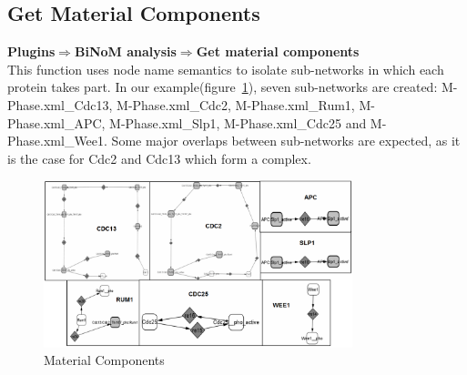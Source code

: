 \subsection{Get Material Components}
\textbf{Plugins$\Rightarrow$BiNoM analysis$\Rightarrow$Get material components}\\
This function uses node name semantics to isolate sub-networks in which each protein takes part. In our example(figure~\ref{Material_Components}), seven sub-networks are created: M-Phase.xml\_Cdc13, M-Phase.xml\_Cdc2, M-Phase.xml\_Rum1, M-Phase.xml\_APC, M-Phase.xml\_Slp1, M-Phase.xml\_Cdc25 and M-Phase.xml\_Wee1. Some major overlaps between sub-networks are expected, as it is the case for Cdc2 and Cdc13 which form a complex.\\
\begin{figure}
\centering
\includegraphics[width=0.8\textwidth]{graphics/Material_components}
\caption{Material Components}
\label{Material_Components}
\end{figure}


